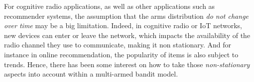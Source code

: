 

%
For cognitive radio applications, as well as other applications such as recommender systems, the assumption that the arms distribution \emph{do not change over time} may be a big limitation.
Indeed, in cognitive radio or IoT networks, new devices can enter or leave the network, which impacts the availability of the radio channel they use to communicate, making it non stationary.
And for instance in online recommendation, the popularity of items is also subject to trends.
Hence, there has been some interest on how to take those \emph{non-stationary} aspects into account within a multi-armed bandit model.

